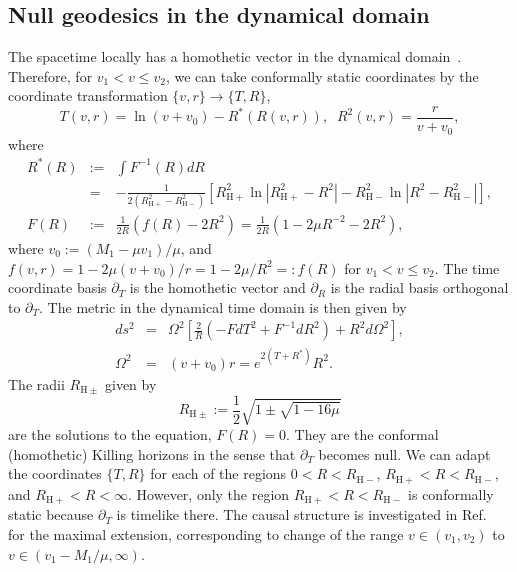 \documentclass[prd,showpacs,preprintnumbers,groupedaddress,superscriptaddress,nofootinbib,11pt]{revtex4-1} %
\theoremstyle{newplain}
\newcommand{\mr}[1]{\mathrm{#1}}
\begin{document}
\subsection{Null geodesics in the dynamical domain}
\label{sec:dynamical_domain}
The spacetime locally has a homothetic vector in the dynamical domain~\cite{nielsen,Hiscock_1982}.
Therefore, for $v_1<v\le v_2$, we can take conformally static coordinates by the coordinate transformation $\{v,r\}\to\{T,R\}$,
\begin{equation}
\label{eq:coordtrans-to-TR}
T(v,r)=\ln (v+v_0)-R^*(R(v,r)),\;\; R^2(v,r)=\frac{r}{v+v_0},
\end{equation}
where
\begin{eqnarray}
R^*(R)&:=&\int F^{-1}(R)dR\nonumber\\
&=&-\frac{1}{2(R_{\mr{H}+}^2-R_{\mr{H}-}^2)}\left[R_{\mr{H}+}^2\ln |R_{\mr{H}+}^2-R^2|-R_{\mr{H}-}^2\ln |R^2-R_{\mr{H}-}^2|\right],\nonumber\\
F(R)&:=&\frac{1}{2R}\left(f(R)-2R^2\right)=\frac{1}{2R}\left(1-2\mu R^{-2}-2R^2\right),\nonumber
\end{eqnarray}
where $v_0:=(M_1-\mu v_1)/\mu$, and $f(v,r)=1-2\mu (v+v_0)/r=1-2\mu /R^2=:f(R)$ for $v_1<v\le v_2$.
The time coordinate basis $\partial_T$ is the homothetic vector and $\partial_R$ is the radial basis orthogonal to $\partial_T$.
The metric in the dynamical time domain is then given by
\begin{eqnarray}
\label{eq:conformally-static-metric}
ds^2&=&\Omega^2\left[\frac{2}{R}\left(-FdT^2+F^{-1}dR^2\right)+R^2d\Omega^2\right],\\
\Omega^2&=&(v+v_0)r=e^{2(T+R^*)}R^2.
\end{eqnarray}
The radii $R_{\mr{H}\pm}$ given by
\begin{equation}
\label{eq:RH+-}
R_{\mr{H}\pm}:=\frac{1}{2}\sqrt{1\pm\sqrt{1-16\mu}}
\end{equation}
are the solutions to the equation, $F(R)=0$.
They are the conformal (homothetic) Killing horizons in the sense that $\partial_T$ becomes null.
We can adapt the coordinates $\{T,R\}$ for each of the regions $0<R<R_{\mr{H}-}$, $R_{\mr{H}+}<R<R_{\mr{H}-}$, and $R_{\mr{H}+}<R<\infty$.
However, only the region $R_{\mr{H}+}<R<R_{\mr{H}-}$ is conformally static because $\partial_T$ is timelike there.
The causal structure is investigated in Ref.~\cite{Hiscock_1982} for the maximal extension, corresponding to change of the range $v\in(v_1,v_2)$ to $v\in(v_1-M_1/\mu,\infty)$.
\end{document}
